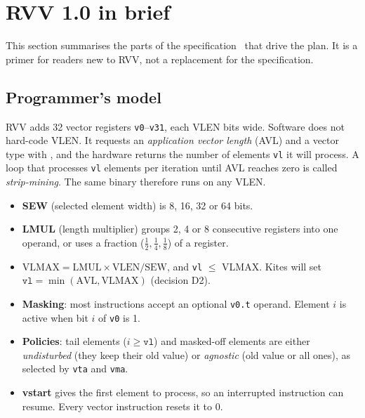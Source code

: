 \documentclass[11pt]{article}
\begin{document}
\section{RVV 1.0 in brief}\label{sec:primer}

This section summarises the parts of the specification~\cite{spec} that drive the plan. It is a
primer for readers new to RVV, not a replacement for the specification.

\subsection{Programmer's model}

RVV adds 32 vector registers \texttt{v0}--\texttt{v31}, each VLEN bits wide. Software does not
hard-code VLEN. It requests an \emph{application vector length} (AVL) and a vector type with
, and the hardware returns the number of elements \texttt{vl} it will process. A
loop that processes \texttt{vl} elements per iteration until AVL reaches zero is called
\emph{strip-mining}. The same binary therefore runs on any VLEN.

\begin{itemize}
\item \textbf{SEW} (selected element width) is 8, 16, 32 or 64 bits.
\item \textbf{LMUL} (length multiplier) groups 2, 4 or 8 consecutive registers into one operand, or
      uses a fraction ($\tfrac12,\tfrac14,\tfrac18$) of a register.
\item $\mathrm{VLMAX} = \mathrm{LMUL}\times\mathrm{VLEN}/\mathrm{SEW}$, and
      \texttt{vl} $\le$ VLMAX. Kites will set $\texttt{vl}=\min(\mathrm{AVL},\mathrm{VLMAX})$ (decision D2).
\item \textbf{Masking}: most instructions accept an optional \texttt{v0.t} operand. Element $i$ is
      active when bit $i$ of \texttt{v0} is 1.
\item \textbf{Policies}: tail elements ($i \ge \texttt{vl}$) and masked-off elements are either
      \emph{undisturbed} (they keep their old value) or \emph{agnostic} (old value or all ones),
      as selected by \texttt{vta} and \texttt{vma}.
\item \textbf{vstart} gives the first element to process, so an interrupted instruction can resume.
      Every vector instruction resets it to 0.
\end{itemize}
\end{document}
